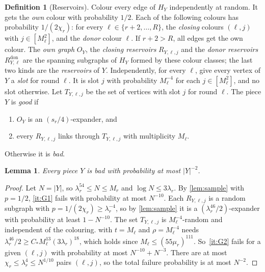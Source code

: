 \documentclass[11pt]{article}
\newtheorem{lemma}[theorem]{Lemma}
\theoremstyle{definition}
\newtheorem{definition}[theorem]{Definition}
\theoremstyle{remark}
\numberwithin{equation}{section}
\numberwithin{figure}{section}
\numberwithin{table}{section}
\newcommand{\Rdon}{R^{\mathrm{don}}}
\begin{document}
\begin{definition}[Reservoirs]\label{def:reservoir}
Colour every edge of $H_Y$ independently at random. It gets the \emph{own}
colour with probability $1/2$. Each of the following colours has probability
$1/(2\chi_r)$: for every $\ell\in\{r+2,\dots,R\}$, the \emph{closing} colours
$(\ell,j)$ with $j\in[M_\ell^2]$, and the \emph{donor} colour $\ell$. If
$r+2>R$, all edges get the own colour. The \emph{own graph} $O_Y$, the
\emph{closing reservoirs} $R_{Y,\ell,j}$ and the \emph{donor reservoirs}
$\Rdon_{Y,\ell}$ are the spanning subgraphs of $H_Y$ formed by these colour
classes; the last two kinds are the \emph{reservoirs} of $Y$. Independently,
for every $\ell$, give every vertex of $Y$ a \emph{slot} for round $\ell$. It is
slot $j$ with probability $M_\ell^{-4}$ for each $j\in[M_\ell^2]$, and no slot
otherwise. Let $T_{Y,\ell,j}$ be the set of vertices with slot $j$ for round
$\ell$. The piece $Y$ is \emph{good} if
\begin{enumerate}[label=(G\arabic*),itemsep=1pt]
\item\label{it:G1} $O_Y$ is an $(s_r/4)$-expander, and
\item\label{it:G2} every $R_{Y,\ell,j}$ links through $T_{Y,\ell,j}$ with
multiplicity $M_\ell$.
\end{enumerate}
Otherwise it is \emph{bad}.
\end{definition}

\begin{lemma}\label{lem:good}
Every piece $Y$ is bad with probability at most $|Y|^{-2}$.
\end{lemma}

\begin{proof}
Let $N=|Y|$, so $\lambda_r^{54}\le N\le M_r$ and $\log N\le3\lambda_r$. By
\cref{lem:sample} with $p=1/2$, \ref{it:G1} fails with probability at most
$N^{-10}$. Each $R_{Y,\ell,j}$ is a random subgraph with
$p=1/(2\chi_r)\ge\lambda_r^{-4}$, so by \cref{lem:sample} it is a
$(\lambda_r^{46}/2)$-expander with probability at least $1-N^{-10}$. The set
$T_{Y,\ell,j}$ is $M_\ell^{-4}$-random and independent of the colouring.
 with $t=M_\ell$ and $\rho=M_\ell^{-4}$ needs
$\lambda_r^{46}/2\ge C_*M_\ell^{13}(3\lambda_r)^{18}$, which holds since
$M_\ell\le(55\mu_r)^{111}$. So~\ref{it:G2} fails for a given $(\ell,j)$ with
probability at most $N^{-10}+N^{-3}$. There are at most
$\chi_r\le\lambda_r^4\le N^{1/10}$ pairs $(\ell,j)$, so the total failure
probability is at most $N^{-2}$.
\end{proof}
\end{document}

